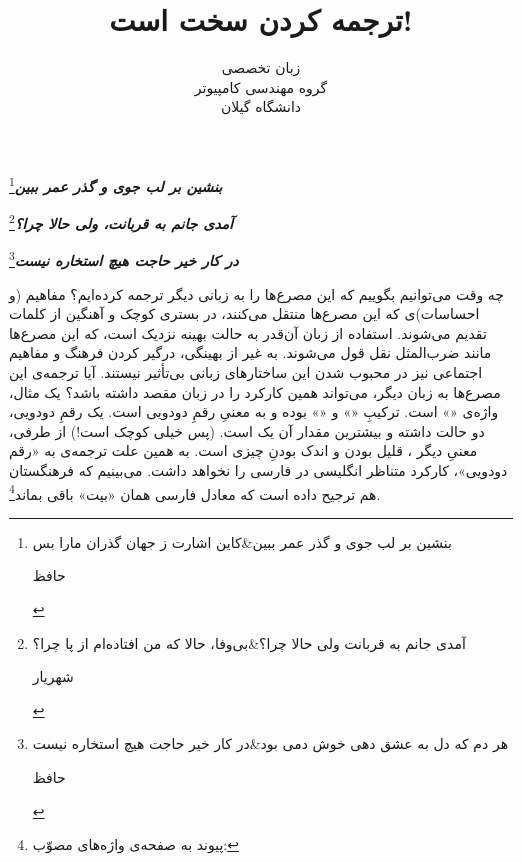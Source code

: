 \documentclass{article}
\begin{document}
\title{ترجمه کردن سخت است!}
\author{زبان تخصصی\\گروه مهندسی کامپیوتر\\دانشگاه گیلان}
\maketitle
\noindent \textbf{\emph{بنشین بر لب جوی و گذر عمر ببین}}\footnote{\begin{traditionalpoem}بنشین بر لب جوی و گذر عمر ببین&کاین اشارت ز جهان گذران مارا بس\end{traditionalpoem}\begin{flushleft}حافظ\end{flushleft}}

	\noindent \textbf{\emph{آمدی جانم به قربانت، ولی حالا چرا؟}}\footnote{\begin{traditionalpoem}آمدی جانم به قربانت ولی حالا چرا؟&بی‌وفا، حالا که من افتاده‌ام از پا چرا؟\end{traditionalpoem}\begin{flushleft}شهریار\end{flushleft}}

		\noindent \textbf{\emph{در کار خیر حاجت هیچ استخاره نیست}}\footnote{\begin{traditionalpoem}هر دم که دل به عشق دهی خوش دمی بود&در کار خیر حاجت هیچ استخاره نیست\end{traditionalpoem}\begin{flushleft}حافظ\end{flushleft}}

\vskip 1cm
\noindent چه وقت می‌توانیم بگوییم که این مصرع‌ها را به زبانی دیگر ترجمه کرده‌ایم؟ مفاهیم (و احساسات)ی که این مصرع‌ها منتقل می‌کنند، در بستری کوچک و آهنگین از کلمات تقدیم می‌شوند. استفاده از زبان آن‌قدر به حالت بهینه نزدیک است، که این مصرع‌ها مانند ضرب‌المثل نقل قول می‌شوند. به غیر از بهینگی، درگیر کردن فرهنگ و مفاهیم اجتماعی نیز در محبوب شدن این ساختار‌های زبانی بی‌تأثیر نیستند. آیا ترجمه‌ی این مصرع‌ها به زبان دیگر، می‌تواند همین کارکرد را در زبان مقصد داشته باشد؟ یک مثال، واژه‌ی «» است.  ترکیبِ «» و «» بوده و به معنیِ رقمِ دودویی است. یک رقمِ دودویی، دو حالت داشته و بیشترین مقدار آن یک است. (پس خیلی کوچک است!) از طرفی، معنیِ دیگر ، قلیل بودن و اندک بودنِ چیزی است. به همین علت ترجمه‌ی  به «رقم دودویی»، کارکرد متناظر انگلیسی در فارسی را نخواهد داشت. می‌بینیم که فرهنگستان هم ترجیح داده است که معادل فارسی  همان «بیت» باقی بماند\footnote{پیوند به صفحه‌ی واژه‌های مصوّب: }.
\end{document}
